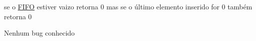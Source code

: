 
\begin{DoxyRefList}
\item[Global \mbox{\hyperlink{FIFO_8h_a9361e817f419f9122ff4e25a0f3b6df1}{My\+F\+I\+F\+O\+Peep}} (\mbox{\hyperlink{structFIFO}{F\+I\+FO}} nome)]\label{bug__bug000002}%
%
se o \mbox{\hyperlink{structFIFO}{F\+I\+FO}} estiver vaizo retorna 0 mas se o último elemento inserido for 0 também retorna 0  
\item[File \mbox{\hyperlink{testapp_8c}{testapp.c}} ]\label{bug__bug000003}%
%
Nenhum bug conhecido
\end{DoxyRefList}